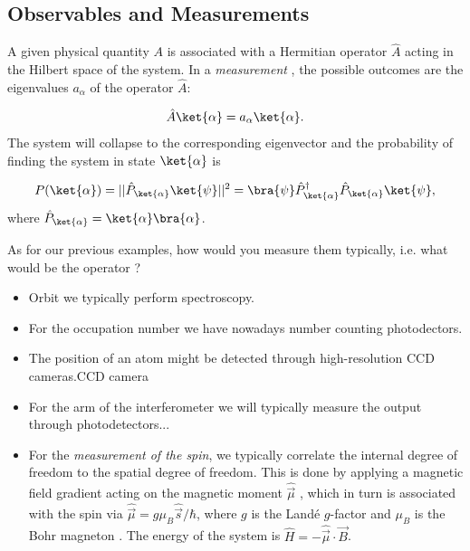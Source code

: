 \subsection{Observables and Measurements}

A given physical quantity $A$ is associated with a Hermitian operator $\hat{A}$  acting in the Hilbert space  of the system.
In a \emph{measurement} , the possible outcomes are the eigenvalues $a_\alpha$  of the operator $\hat{A}$:

\begin{align}
				\hat{A}\ket{\alpha}=a_{\alpha}\ket{\alpha}.
			
\end{align}
The system will collapse to the corresponding eigenvector  and the probability of finding the system in state $\ket{\alpha}$ is

\begin{align}
	P(\ket{\alpha})=||\hat{P}_{\ket{\alpha}} \ket{\psi}||^2 = \bra{\psi} \hat{P}^{\dag}_{\ket{\alpha}} \hat{P}_{\ket{\alpha}} \ket{\psi},
\end{align}
where $\hat{P}_{\ket{\alpha}}= \ket{\alpha} \bra{\alpha}$.

As for our previous examples, how would you measure them typically, i.e. what would be the operator ?
\begin{itemize}
\item Orbit we typically perform spectroscopy.
\item For the occupation number we have nowadays number counting photodectors.
\item The position of an atom might be detected through high-resolution CCD cameras.CCD camera
\item For the arm of the interferometer we will typically measure the output through photodetectors...
\item For the \textit{measurement of the spin}, we typically correlate the internal degree of freedom to the spatial degree of freedom. This is done by applying a magnetic field gradient acting on the magnetic moment $\hat{\vec{\mu}}$ , which in turn is associated with the spin via $\hat{\vec{\mu}} = g \mu_B \hat{\vec{s}}/\hbar$, where $g$ is the Landé $g$-factor  and $\mu_B$ is the Bohr magneton . The energy of the system is $\hat{H} = -\hat{\vec{\mu}} \cdot \vec{B}$.
\end{itemize}